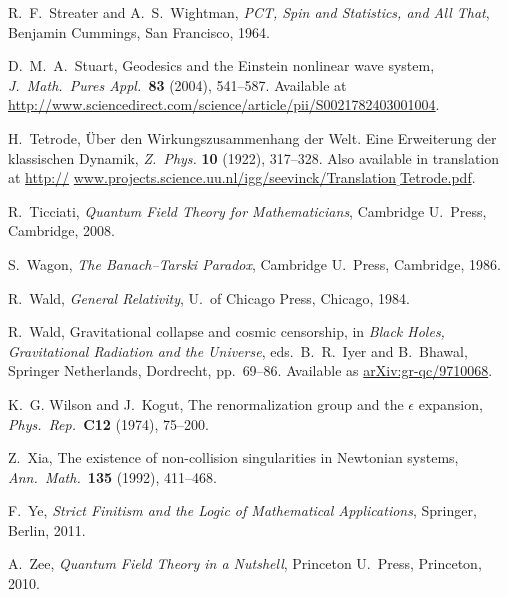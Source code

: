 \documentclass{article}
\begin{document}
\begin{thebibliography}{10}
 R.\ F.\ Streater and A.\ S.\ Wightman, \textsl{PCT, Spin and Statistics, and All That}, Benjamin Cummings, San Francisco, 1964.

 D.\ M.\ A.\ Stuart, Geodesics and the Einstein nonlinear wave system, 
\textsl{J.\ Math.\ Pures Appl.\ }\textbf{83} (2004), 541--587.  Available at \href{http://www.sciencedirect.com/science/article/pii/S0021782403001004}{http://www.sciencedirect.com/science/article/pii/S0021782403001004}.

 H.\ Tetrode, \"Uber den Wirkungszusammenhang der Welt. Eine Erweiterung der klassischen Dynamik, \textsl{Z.\ Phys.} \textbf{10} (1922), 317--328.  Also available in translation at  \href{http://www.projects.science.uu.nl/igg/seevinck/Translation_Tetrode.pdf}{http://}
 \href{http://www.projects.science.uu.nl/igg/seevinck/Translation_Tetrode.pdf} {www.projects.science.uu.nl/igg/seevinck/Translation$\underline{\;}$Tetrode.pdf}.

 R.\ Ticciati, \textsl{Quantum Field Theory for Mathematicians},
Cambridge U.\ Press, Cambridge, 2008.

 S.\ Wagon, {\sl The Banach--Tarski Paradox}, Cambridge
U.\ Press, Cambridge, 1986.

 R.\ Wald, \textsl{General Relativity}, U.\ of Chicago Press, Chicago, 
1984.

 R.\ Wald, Gravitational collapse and cosmic censorship, in \textsl{Black Holes, Gravitational Radiation and the Universe}, eds.\ 
B.\ R.\ Iyer and B.\ Bhawal, Springer Netherlands, Dordrecht, pp.\ 69--86.
Available as \href{http://arxiv.org/abs/gr-qc/9710068}{arXiv:gr-qc/9710068}.

 K.\ G. Wilson and J.\ Kogut, The renormalization group and the $\epsilon$ expansion, \textsl{Phys.\ Rep.\ }\textbf{C12} (1974), 75--200. 

 Z.\ Xia, The existence of non-collision singularities in Newtonian systems, \textsl{Ann.\ Math.\ }{\bf 135} (1992), 411--468. 

  F.\ Ye, \textsl{Strict Finitism and the Logic of Mathematical Applications}, Springer,
Berlin, 2011.

 A.\ Zee, \textsl{Quantum Field Theory in a Nutshell}, Princeton U.\ 
Press, Princeton, 2010.

\end{thebibliography}
\end{document}
